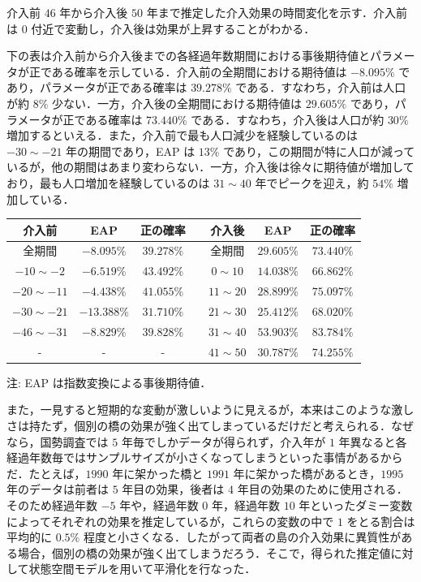 介入前 \(46\) 年から介入後 \(50\)
年まで推定した介入効果の時間変化を示す．介入前は \(0\)
付近で変動し，介入後は効果が上昇することがわかる．

下の表は介入前から介入後までの各経過年数期間における事後期待値とパラメータが正である確率を示している．介入前の全期間における期待値は
\(-8.095\%\) であり，パラメータが正である確率は \(39.278\%\)
である．すなわち，介入前は人口が約 \(8\%\)
少ない．一方，介入後の全期間における期待値は \(29.605\%\)
であり，パラメータが正である確率は \(73.440\%\)
である．すなわち，介入後は人口が約 \(30\%\)
増加するといえる．また，介入前で最も人口減少を経験しているのは
\(-30 \sim -21\) 年の期間であり，EAP は \(13\%\)
であり，この期間が特に人口が減っているが，他の期間はあまり変わらない．一方，介入後は徐々に期待値が増加しており，最も人口増加を経験しているのは
\(31 \sim 40\) 年でピークを迎え，約 \(54\%\) 増加している．

\begin{longtable}[]{@{}ccccccc@{}}
\toprule
介入前 & EAP & 正の確率 & & 介入後 & EAP & 正の確率\tabularnewline
\midrule
\endhead
全期間 & \(-8.095\%\) & \(39.278\%\) & & 全期間 & \(29.605\%\) &
\(73.440\%\)\tabularnewline
\(-10 \sim -2\) & \(-6.519\%\) & \(43.492\%\) & & \(0 \sim 10\) &
\(14.038\%\) & \(66.862\%\)\tabularnewline
\(-20 \sim -11\) & \(-4.438\%\) & \(41.055\%\) & & \(11 \sim 20\) &
\(28.899\%\) & \(75.097\%\)\tabularnewline
\(-30 \sim -21\) & \(-13.388\%\) & \(31.710\%\) & & \(21 \sim 30\) &
\(25.412\%\) & \(68.020\%\)\tabularnewline
\(-46 \sim -31\) & \(-8.829\%\) & \(39.828\%\) & & \(31 \sim 40\) &
\(53.903\%\) & \(83.784\%\)\tabularnewline
- & - & - & & \(41 \sim 50\) & \(30.787\%\) &
\(74.255\%\)\tabularnewline
\bottomrule
\end{longtable}

注: EAP は指数変換による事後期待値．

また，一見すると短期的な変動が激しいように見えるが，本来はこのような激しさは持たず，個別の橋の効果が強く出てしまっているだけだと考えられる．なぜなら，国勢調査では
\(5\) 年毎でしかデータが得られず，介入年が \(1\)
年異なると各経過年数毎ではサンプルサイズが小さくなってしまうといった事情があるからだ．たとえば，\(1990\)
年に架かった橋と \(1991\) 年に架かった橋があるとき，\(1995\)
年のデータは前者は \(5\) 年目の効果，後者は \(4\)
年目の効果のために使用される．そのため経過年数 \(-5\) 年や，経過年数
\(0\) 年，経過年数 \(10\)
年といったダミー変数によってそれぞれの効果を推定しているが，これらの変数の中で
\(1\) をとる割合は平均的に \(0.5\%\)
程度と小さくなる．したがって両者の島の介入効果に異質性がある場合，個別の橋の効果が強く出てしまうだろう．そこで，得られた推定値に対して状態空間モデルを用いて平滑化を行なった．


